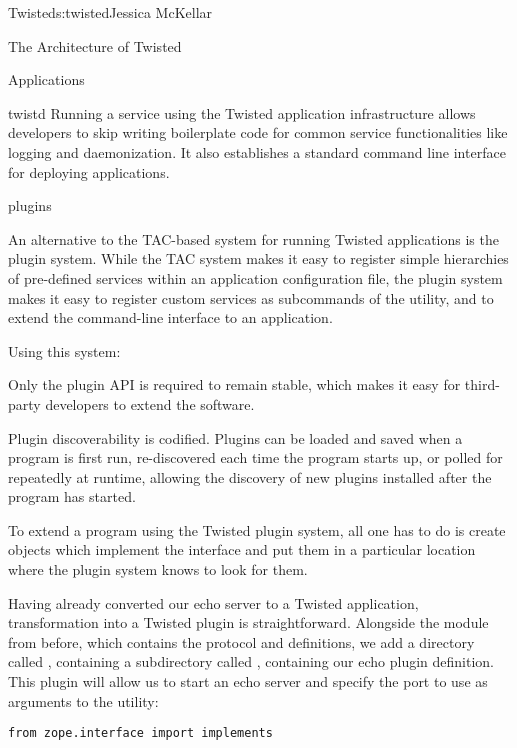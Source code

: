 \begin{aosachapter}{Twisted}{s:twisted}{Jessica McKellar}
\begin{aosasect1}{The Architecture of Twisted}
\begin{aosasect2}{Applications}
\begin{aosasect3}{twistd}
Running a service using the Twisted application infrastructure allows
developers to skip writing boilerplate code for common service functionalities
like logging and daemonization. It also establishes a standard command line
interface for deploying applications.

\end{aosasect3}

\begin{aosasect3}{plugins}

An alternative to the TAC-based system for running Twisted applications is
the plugin system. While the TAC system makes it easy to register simple
hierarchies of pre-defined services within an application configuration file,
the plugin system makes it easy to register custom services as subcommands of
the  utility, and to extend the command-line interface to an
application.

Using this system:

\begin{aosaenumerate}

\item Only the plugin API is required to remain stable, which makes it
  easy for third-party developers to extend the software.

\item Plugin discoverability is codified. Plugins can be loaded and
  saved when a program is first run, re-discovered each time the
  program starts up, or polled for repeatedly at runtime, allowing the
  discovery of new plugins installed after the program has started.

\end{aosaenumerate}

To extend a program using the Twisted plugin system, all one has to do is
create objects which implement the  interface and put them
in a particular location where the plugin system knows to look for them.

Having already converted our echo server to a Twisted application,
transformation into a Twisted plugin is straightforward. Alongside the
 module from before, which contains the 
protocol and  definitions, we add a directory called
, containing a subdirectory called ,
containing our echo plugin definition. This plugin will allow us to start an
echo server and specify the port to use as arguments to the  utility:

\begin{verbatim}
from zope.interface import implements


\end{verbatim}
\end{aosasect3}
\end{aosasect2}
\end{aosasect1}
\end{aosachapter}
